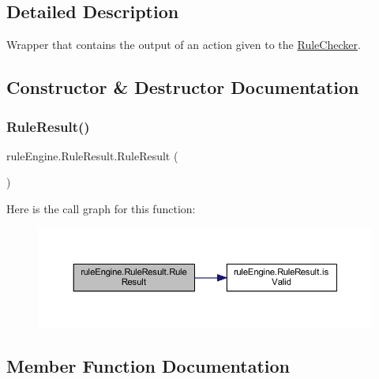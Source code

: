 \subsection{Detailed Description}
Wrapper that contains the output of an action given to the \mbox{\hyperlink{classrule_engine_1_1_rule_checker}{Rule\+Checker}}. 

\subsection{Constructor \& Destructor Documentation}
\mbox{\label{classrule_engine_1_1_rule_result_a3f965dc55a0b913c1da1c8c567fa1814}} 
\subsubsection{\texorpdfstring{Rule\+Result()}{RuleResult()}}
{\footnotesize\ttfamily rule\+Engine.\+Rule\+Result.\+Rule\+Result (\begin{DoxyParamCaption}{ }\end{DoxyParamCaption})\hspace{0.3cm}{\ttfamily [inline]}}

Here is the call graph for this function\+:
\nopagebreak
\begin{figure}[H]
\begin{center}
\leavevmode
\includegraphics[width=350pt]{classrule_engine_1_1_rule_result_a3f965dc55a0b913c1da1c8c567fa1814_cgraph}
\end{center}
\end{figure}


\subsection{Member Function Documentation}
\mbox{\label{classrule_engine_1_1_rule_result_a530d8dd9cb3461dba440b37e12347f5a}} 
